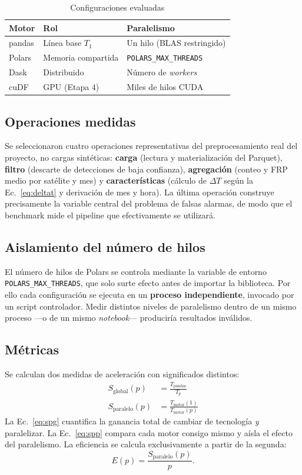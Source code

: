 \documentclass[conference]{IEEEtran}
\begin{document}
\begin{table}[t]
\caption{Configuraciones evaluadas}
\label{tab:backends}
\centering
\renewcommand{\arraystretch}{1.25}
\begin{tabular}{p{1.5cm} p{2.3cm} p{3.4cm}}
\toprule
\textbf{Motor} & \textbf{Rol} & \textbf{Paralelismo} \\
\midrule
pandas & Línea base $T_1$ & Un hilo (BLAS restringido) \\
Polars & Memoria compartida & \texttt{POLARS\_MAX\_THREADS} \\
Dask & Distribuido & Número de \textit{workers} \\
cuDF & GPU (Etapa 4) & Miles de hilos CUDA \\
\bottomrule
\end{tabular}
\end{table}

\subsection{Operaciones medidas}
Se seleccionaron cuatro operaciones representativas del preprocesamiento real del proyecto, no cargas sintéticas: \textbf{carga} (lectura y materialización del Parquet), \textbf{filtro} (descarte de detecciones de baja confianza), \textbf{agregación} (conteo y FRP medio por satélite y mes) y \textbf{características} (cálculo de $\Delta T$ según la Ec.~\ref{eq:deltat} y derivación de mes y hora). La última operación construye precisamente la variable central del problema de falsas alarmas, de modo que el benchmark mide el pipeline que efectivamente se utilizará.

\subsection{Aislamiento del número de hilos}
El número de hilos de Polars se controla mediante la variable de entorno \texttt{POLARS\_MAX\_THREADS}, que solo surte efecto antes de importar la biblioteca. Por ello cada configuración se ejecuta en un \textbf{proceso independiente}, invocado por un script controlador. Medir distintos niveles de paralelismo dentro de un mismo proceso —o de un mismo \textit{notebook}— produciría resultados inválidos.

\subsection{Métricas}
Se calculan dos medidas de aceleración con significados distintos:
\begin{align}
S_{\text{global}}(p) &= \frac{T_{\text{pandas}}}{T_p} \label{eq:spg}\\[2pt]
S_{\text{paralelo}}(p) &= \frac{T_{\text{motor}}(1)}{T_{\text{motor}}(p)} \label{eq:spp}
\end{align}
La Ec.~\ref{eq:spg} cuantifica la ganancia total de cambiar de tecnología \textit{y} paralelizar. La Ec.~\ref{eq:spp} compara cada motor consigo mismo y aísla el efecto del paralelismo. La eficiencia se calcula exclusivamente a partir de la segunda:
\begin{equation}
E(p) = \frac{S_{\text{paralelo}}(p)}{p}.
\label{eq:ef}
\end{equation}
\end{document}

